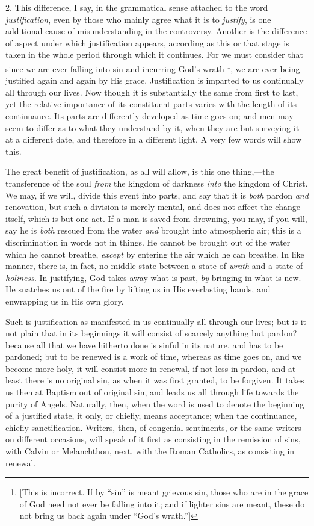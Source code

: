 2. This difference, I say, in the grammatical sense attached to the
word \emph{justification}, even by those who mainly agree what
it is to \emph{justify}, is one additional cause of misunderstanding
in the controversy. Another is the difference of aspect under which
justification appears, according as this or that stage is taken in the
whole period through which it continues. For we must consider that
since we are ever falling into sin and incurring God's wrath \footnote{[This is
incorrect. If by ``sin'' is meant grievous sin, those who are
in the grace of God need not ever be falling into it; and if lighter
sins are meant, these do not bring us back again under ``God's
wrath.'']}, we are ever being justified again and again by His grace.
Justification is imparted to us continually all through our lives. Now
though it is substantially the same from first to last, yet the
relative importance of its constituent parts varies with the length of
its continuance. Its parts are differently developed as time goes on;
and men may seem to differ as to what they understand by it, when they
are but surveying it at a different date, and therefore in a different
light. A very few words will show this.

The great benefit of justification, as all will allow, is this one
thing,—the transference of the soul \emph{from} the kingdom of
darkness \emph{into} the kingdom of Christ. We may, if we will, divide
this event into parts, and say that it is \emph{both} pardon \emph{and}
renovation, but such a division is merely mental, and does not affect
the change itself, which is but one act. If a man is saved from
drowning, you may, if you will, say he is \emph{both} rescued from the
water \emph{and} brought into atmospheric air; this is a
discrimination in words not in things. He cannot be brought out of the
water which he cannot breathe, \emph{except} by entering the air
which he can breathe. In like manner, there is, in fact, no middle
state between a state of \emph{wrath} and a state of \emph{holiness}.
In justifying, God takes away what is past, \emph{by} bringing in what
is new. He snatches us out of the fire by lifting us in His
everlasting hands, and enwrapping us in His own glory.

Such is justification as manifested in us continually all through
our lives; but is it not plain that in its beginnings it will consist
of scarcely anything but pardon? because all that we have hitherto
done is sinful in its nature, and has to be pardoned; but to be
renewed is a work of time, whereas as time goes on, and we become more
holy, it will consist more in renewal, if not less in pardon, and at
least there is no original sin, as when it was first granted, to be
forgiven. It takes us then at Baptism out of original sin, and leads
us all through life towards the purity of Angels. Naturally, then,
when the word is used to denote the beginning of a justified state, it
only, or chiefly, means acceptance; when the continuance, chiefly
sanctification. Writers, then, of congenial sentiments, or the same
writers on different occasions, will speak of it first as consisting
in the remission of sins, with Calvin or Melanchthon, next, with the
Roman Catholics, as consisting in renewal.

